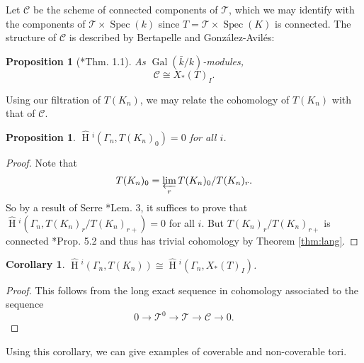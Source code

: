 \documentclass{amsart}
\theoremstyle{plain}
\newtheorem{proposition}[theorem]{Proposition}
\newtheorem{corollary}[theorem]{Corollary}
\newcommand{\HT}[1]{\hat{\HH}{}^{#1}}
\theoremstyle{definition}
\numberwithin{equation}{section}
\DeclareMathOperator{\Gal}{Gal}
\DeclareMathOperator{\HH}{H}
\DeclareMathOperator{\Spec}{Spec}
\newcommand{\TT}{\mathcal{T}}
\newcommand{\C}{\mathcal{C}}
\newcommand{\invlim}[1]{\varprojlim_{#1}}
\begin{document}
Let $\C$ be the scheme of
connected components of $\TT$,
which we may identify with the
components of $\TT \times \Spec(k)$ since $T = \TT \times \Spec(K)$
is connected.  The structure of $\C$ is described by Bertapelle and Gonz\'alez-Avil\'es:

\begin{proposition}[{\cite{bertapelle-gonzalez:13b}*{Thm. 1.1}}]
As $\Gal(\bar{k}/k)$-modules,
\[
\C \cong X_*(T)_I.
\]
\end{proposition}

Using our filtration of $T(K_n)$, we may relate the cohomology of $T(K_n)$
with that of $\C$.

\begin{proposition}\label{prop:T0_cohom_triv}
$\HT{i}(\Gamma_n, T(K_n)_0) = 0$ for all $i$.
\end{proposition}
\begin{proof}
Note that
$$T(K_n)_0 = \invlim{r} T(K_n)_0 / T(K_n)_r.$$
So by a result of Serre \cite{serre:LocalClassFieldThy}*{Lem. 3}, it suffices to prove that
\\ $\HT{i}(\Gamma_n, T(K_n)_r / T(K_n)_{r+}) = 0$ for all $i$.  But $T(K_n)_r / T(K_n)_{r+}$
is connected \cite{yu:03a}*{Prop. 5.2} and thus has trivial cohomology by
Theorem \ref{thm:lang}.
\end{proof}

\begin{corollary} \label{cor:cohom_tori}
$\HT{i}(\Gamma_n, T(K_n)) \cong \HT{i}(\Gamma_n, X_*(T)_I)$.
\end{corollary}

\begin{proof}
This follows from the long exact sequence in cohomology associated to the sequence
$$0 \rightarrow \TT^0 \rightarrow \TT \rightarrow \C \rightarrow 0.$$
\end{proof}

Using this corollary, we can give examples of coverable and non-coverable tori.
\end{document}
